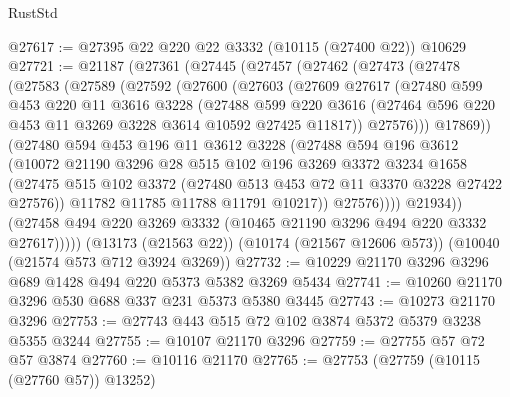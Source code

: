 \begin{lexlean}{RustStd}
\begin{coremodule}
@27617 := @27395 @22 @220 @22 @3332 (@10115 (@27400 @22)) @10629
@27721 := @21187
    (@27361
      (@27445
        (@27457
          (@27462
            (@27473
              (@27478
                (@27583
                  (@27589
                    (@27592
                      (@27600
                        (@27603
                          (@27609
                            @27617
                            (@27480
                              @599
                              @453
                              @220
                              @11
                              @3616
                              @3228
                              (@27488
                                @599
                                @220
                                @3616
                                (@27464 @596 @220 @453 @11 @3269 @3228 @3614 @10592 @27425 @11817))
                              @27576)))
                        @17869))
                    (@27480
                      @594
                      @453
                      @196
                      @11
                      @3612
                      @3228
                      (@27488
                        @594
                        @196
                        @3612
                        (@10072
                          @21190
                          @3296
                          @28
                          @515
                          @102
                          @196
                          @3269
                          @3372
                          @3234
                          @1658
                          (@27475
                            @515
                            @102
                            @3372
                            (@27480 @513 @453 @72 @11 @3370 @3228 @27422 @27576))
                          @11782
                          @11785
                          @11788
                          @11791
                          @10217))
                      @27576))))
              @21934))
          (@27458 @494 @220 @3269 @3332 (@10465 @21190 @3296 @494 @220 @3332 @27617)))))
    (@13173 (@21563 @22))
    (@10174 (@21567 @12606 @573))
    (@10040 (@21574 @573 @712 @3924 @3269))
@27732 := @10229 @21170 @3296 @3296 @689 @1428 @494 @220 @5373 @5382 @3269 @5434
@27741 := @10260 @21170 @3296 @530 @688 @337 @231 @5373 @5380 @3445
@27743 := @10273 @21170 @3296
@27753 := @27743 @443 @515 @72 @102 @3874 @5372 @5379 @3238 @5355 @3244
@27755 := @10107 @21170 @3296
@27759 := @27755 @57 @72 @57 @3874
@27760 := @10116 @21170
@27765 := @27753 (@27759 (@10115 (@27760 @57)) @13252)

\end{coremodule}
\end{lexlean}
